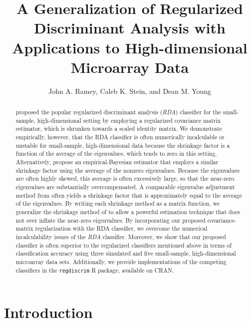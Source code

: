 \documentclass[11pt]{article}
\title{A Generalization of Regularized Discriminant Analysis with Applications to High-dimensional Microarray Data}
\author{John A. Ramey, Caleb K. Stein, and Dean M. Young}
\begin{document}
\newtheorem*{thm}{Theorem}
\newtheorem*{cor}{Corollary}


\doublespacing

\maketitle



\begin{abstract}
\cite{Friedman:1989tm} proposed the popular regularized discriminant analysis (\emph{RDA}) classifier for the small-sample, high-dimensional setting by employing a regularized covariance matrix estimator, which is shrunken towards a scaled identity matrix. We demonstrate empirically, however, that the RDA classifier is often numerically incalculable or unstable for small-sample, high-dimensional data because the shrinkage factor is a function of the average of the eigenvalues, which tends to zero in this setting. Alternatively, \cite{Srivastava:2007ww} propose an empirical-Bayesian estimator that employs a similar shrinkage factor using the average of the nonzero eigenvalues.  Because the eigenvalues are often highly skewed, this average is often excessively large, so that the near-zero eigenvalues are substantially overcompensated. A comparable eigenvalue adjustment method from \cite{Thomaz:2006ef} often yields a shrinkage factor that is approximately equal to the average of the eigenvalues. By writing each shrinkage method as a matrix function, we generalize the shrinkage method of \cite{Thomaz:2006ef} to allow a powerful estimation technique that does not over inflate the near-zero eigenvalues. By incorporating our proposed covariance-matrix regularization with the RDA classifier, we overcome the numerical incalculability issues of the \emph{RDA} classifier. Moreover, we show that our proposed classifier is often superior to the regularized classifiers mentioned above in terms of classification accuracy using three simulated and five small-sample, high-dimensional microarray data sets. Additionally, we provide implementations of the competing classifiers in the {\tt regdiscrim} R package, available on CRAN.
\end{abstract}

\section{Introduction}
\end{document}
